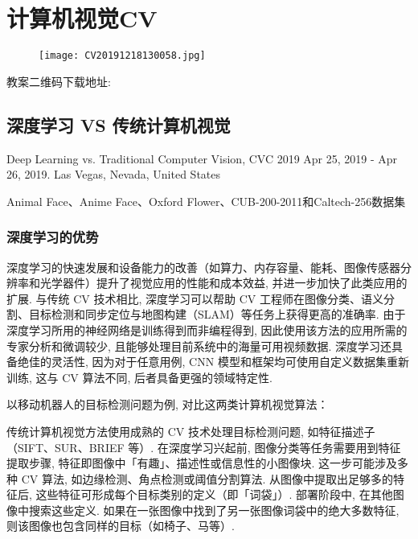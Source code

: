 \chapter{计算机视觉CV}\label{AIChapter11}
\begin{figure}[H]
\centering
\texttt{[image: CV20191218130058.jpg]}
\label{CV20191218130058}
\end{figure}
教案二维码下载地址: 
\newpage
\section{深度学习 VS 传统计算机视觉}
Deep Learning vs. Traditional Computer Vision, CVC 2019  Apr 25, 2019 - Apr 26, 2019. Las Vegas, Nevada, United States \cite{MahonyCVC2019}

Animal Face、Anime Face、Oxford Flower、CUB-200-2011和Caltech-256数据集


\subsection{深度学习的优势}

深度学习的快速发展和设备能力的改善（如算力、内存容量、能耗、图像传感器分辨率和光学器件）提升了视觉应用的性能和成本效益, 并进一步加快了此类应用的扩展. 与传统 CV 技术相比, 深度学习可以帮助 CV 工程师在图像分类、语义分割、目标检测和同步定位与地图构建（SLAM）等任务上获得更高的准确率. 由于深度学习所用的神经网络是训练得到而非编程得到, 因此使用该方法的应用所需的专家分析和微调较少, 且能够处理目前系统中的海量可用视频数据. 深度学习还具备绝佳的灵活性, 因为对于任意用例, CNN 模型和框架均可使用自定义数据集重新训练, 这与 CV 算法不同, 后者具备更强的领域特定性.

以移动机器人的目标检测问题为例, 对比这两类计算机视觉算法：

传统计算机视觉方法使用成熟的 CV 技术处理目标检测问题, 如特征描述子（SIFT、SUR、BRIEF 等）. 在深度学习兴起前, 图像分类等任务需要用到特征提取步骤, 特征即图像中「有趣」、描述性或信息性的小图像块. 这一步可能涉及多种 CV 算法, 如边缘检测、角点检测或阈值分割算法. 从图像中提取出足够多的特征后, 这些特征可形成每个目标类别的定义（即「词袋」）. 部署阶段中, 在其他图像中搜索这些定义. 如果在一张图像中找到了另一张图像词袋中的绝大多数特征, 则该图像也包含同样的目标（如椅子、马等）.

